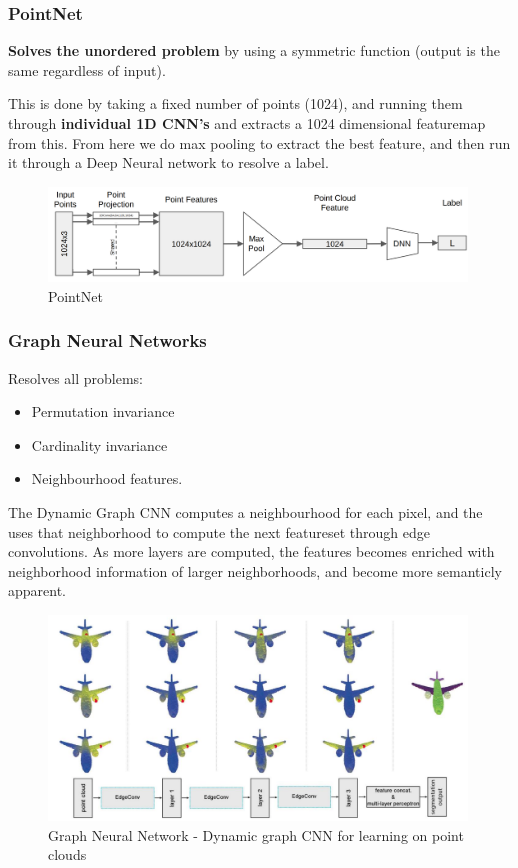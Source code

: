 \documentclass[a4paper]{article}
\begin{document}
\subsubsection*{PointNet}
\textbf{Solves the unordered problem} by using a symmetric function (output is the same regardless of input).


This is done by taking a fixed number of points (1024), and running them through \textbf{individual 1D CNN's} and extracts a 1024 dimensional featuremap from this. From here we do max pooling to extract the best feature, and then run it through a Deep Neural network to resolve a label. 
\begin{figure}[H]
\centering
\includegraphics[width=0.99\textwidth]{figures/PointNet.png}
\caption{PointNet}
\label{fig:pointNet}
\end{figure} 




\subsubsection*{Graph Neural Networks}
Resolves all problems: 
\begin{itemize}
	\item Permutation invariance
	\item Cardinality invariance
	\item Neighbourhood features. 
\end{itemize}

The Dynamic Graph CNN computes a neighbourhood for each pixel, and the uses that neighborhood to compute the next featureset through edge convolutions. As more layers are computed, the features becomes enriched with neighborhood information of larger neighborhoods, and become more semanticly apparent. 
\begin{figure}[H]
\centering
\includegraphics[width=0.99\textwidth]{figures/GNN.png}
\caption{Graph Neural Network - Dynamic graph CNN for learning on point clouds}
\label{fig:GNN}
\end{figure} 
\end{document}
